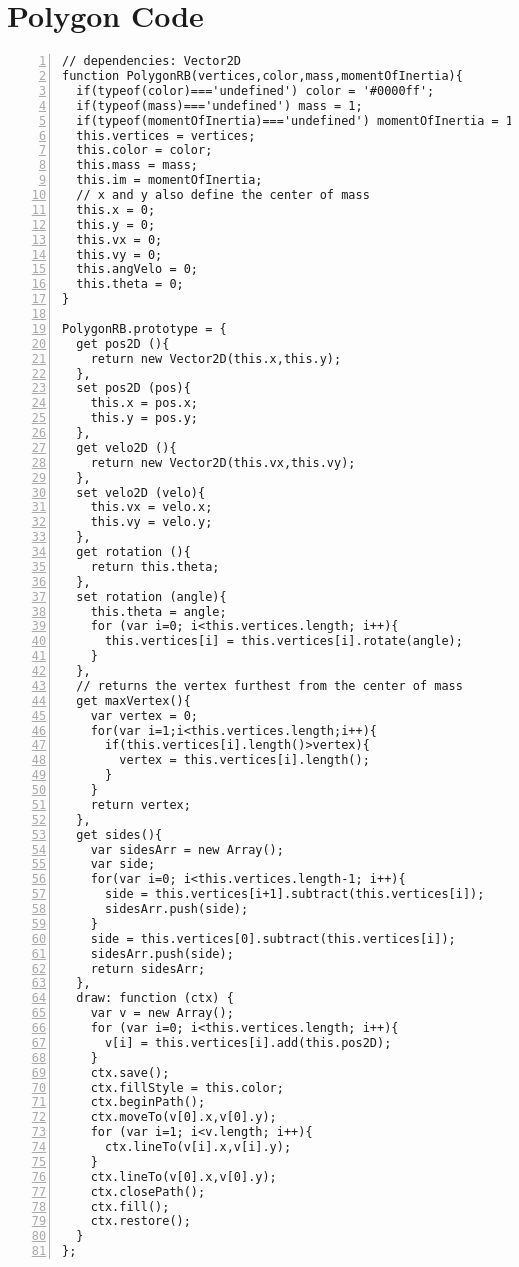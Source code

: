 \section{Polygon Code}
\begin{lstlisting}[breaklines=true, frame=single, numbers=left, caption=Code used to create and manipulate polygon rigid bodies]
// dependencies: Vector2D
function PolygonRB(vertices,color,mass,momentOfInertia){
  if(typeof(color)==='undefined') color = '#0000ff';
  if(typeof(mass)==='undefined') mass = 1;  
  if(typeof(momentOfInertia)==='undefined') momentOfInertia = 1;  
  this.vertices = vertices;
  this.color = color;
  this.mass = mass;
  this.im = momentOfInertia;
  // x and y also define the center of mass
  this.x = 0;
  this.y = 0;
  this.vx = 0;
  this.vy = 0;  
  this.angVelo = 0; 
  this.theta = 0;
}   

PolygonRB.prototype = {
  get pos2D (){
    return new Vector2D(this.x,this.y);     
  },
  set pos2D (pos){
    this.x = pos.x;
    this.y = pos.y;
  },
  get velo2D (){
    return new Vector2D(this.vx,this.vy);     
  },
  set velo2D (velo){
    this.vx = velo.x;
    this.vy = velo.y;
  },    
  get rotation (){
    return this.theta;
  },  
  set rotation (angle){ 
    this.theta = angle;
    for (var i=0; i<this.vertices.length; i++){
      this.vertices[i] = this.vertices[i].rotate(angle);
    }
  },  
  // returns the vertex furthest from the center of mass
  get maxVertex(){
    var vertex = 0;
    for(var i=1;i<this.vertices.length;i++){
      if(this.vertices[i].length()>vertex){
        vertex = this.vertices[i].length();
      }
    }
    return vertex;
  },  
  get sides(){
    var sidesArr = new Array();
    var side;
    for(var i=0; i<this.vertices.length-1; i++){
      side = this.vertices[i+1].subtract(this.vertices[i]);
      sidesArr.push(side);
    }
    side = this.vertices[0].subtract(this.vertices[i]);
    sidesArr.push(side);  
    return sidesArr;  
  },
  draw: function (ctx) {  
    var v = new Array();
    for (var i=0; i<this.vertices.length; i++){
      v[i] = this.vertices[i].add(this.pos2D);
    }
    ctx.save();
    ctx.fillStyle = this.color;
    ctx.beginPath();  
    ctx.moveTo(v[0].x,v[0].y);
    for (var i=1; i<v.length; i++){
      ctx.lineTo(v[i].x,v[i].y);
    }
    ctx.lineTo(v[0].x,v[0].y);
    ctx.closePath();
    ctx.fill(); 
    ctx.restore();
  }
};
\end{lstlisting}



































